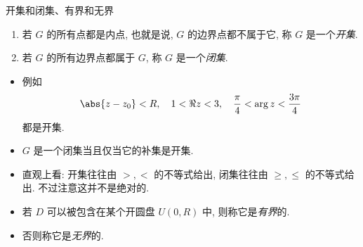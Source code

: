 \begin{frame}{开集和闭集、有界和无界}
	\onslide<+->
	\begin{definition}[nearnext]
		\begin{enumerate}
			\item 若 $G$ 的所有点都是内点, 也就是说, $G$ 的边界点都不属于它, 称 $G$ 是一个\emph{开集}.
			\item 若 $G$ 的所有边界点都属于 $G$, 称 $G$ 是一个\emph{闭集}.
		\end{enumerate}
	\end{definition}
	\begin{itemize}
		\item 例如
		\[
			\abs{z-z_0}<R,\quad 1<\Re z<3,\quad\frac\pi4<\arg z<\dfrac{3\pi}4
		\]
		都是开集.
		\item $G$ 是一个闭集当且仅当它的补集是开集.
		\item 直观上看: 开集往往由 $>,<$ 的不等式给出, 闭集往往由 $\ge,\le$ 的不等式给出. 
		不过注意这并不是绝对的.
		\item 若 $D$ 可以被包含在某个开圆盘 $U(0,R)$ 中, 则称它是\emph{有界}的.
		\item 否则称它是\emph{无界}的.
	\end{itemize}
\end{frame}


